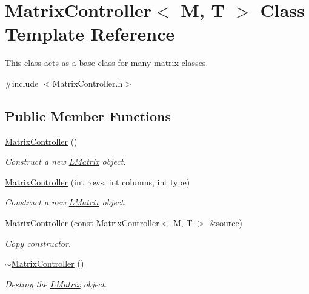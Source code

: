 \hypertarget{class_matrix_controller}{}\section{Matrix\+Controller$<$ M, T $>$ Class Template Reference}
\label{class_matrix_controller}


This class acts as a base class for many matrix classes.  




{\ttfamily \#include $<$Matrix\+Controller.\+h$>$}

\subsection*{Public Member Functions}
\begin{DoxyCompactItemize}
\item 
\mbox{\hyperlink{class_matrix_controller_ad3e161e9dfa785fc9e9007b12d79a834}{Matrix\+Controller}} ()
\begin{DoxyCompactList}\small\item\em Construct a new \mbox{\hyperlink{class_l_matrix}{L\+Matrix}} object. \end{DoxyCompactList}\item 
\mbox{\hyperlink{class_matrix_controller_a25d13774e48d029ac6095c9b7637cb23}{Matrix\+Controller}} (int rows, int columns, int type)
\begin{DoxyCompactList}\small\item\em Construct a new \mbox{\hyperlink{class_l_matrix}{L\+Matrix}} object. \end{DoxyCompactList}\item 
\mbox{\hyperlink{class_matrix_controller_a2a97e643dacd9162bb88c680c7169f5c}{Matrix\+Controller}} (const \mbox{\hyperlink{class_matrix_controller}{Matrix\+Controller}}$<$ M, T $>$ \&source)
\begin{DoxyCompactList}\small\item\em Copy constructor. \end{DoxyCompactList}\item 
\mbox{\hyperlink{class_matrix_controller_ac3e8818bb538155c6cb7a46a9ec92ece}{$\sim$\+Matrix\+Controller}} ()
\begin{DoxyCompactList}\small\item\em Destroy the \mbox{\hyperlink{class_l_matrix}{L\+Matrix}} object. \end{DoxyCompactList}\item 

\end{DoxyCompactItemize}
